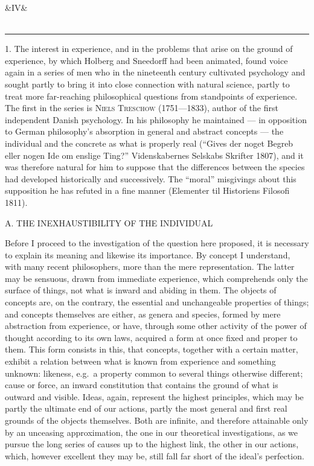 \documentclass[12pt,a4paper,openany]{book}
\newcommand{\opage}[1]{\marginnote{\footnotesize\textit{[#1]}}}
\newcommand{\anthsection}[2]{\clearpage\begin{center}\ifx&#1&\else{\large #1}\\[0.6em]\fi{\Large #2}\\[0.5em]\rule{3em}{0.4pt}\end{center}\medskip}
\newcommand{\excerpthead}[1]{\par\bigskip\begin{center}#1\end{center}\nopagebreak\smallskip}
\newenvironment{intro}{\par}{\par}
\begin{document}
\setcounter{footnote}{0}%
\anthsection{IV} {THE PSYCHOLOGICAL SCHOOL (TRESCHOW, SIBBERN, HOWITZ).}\opage{99}

\begin{intro}

1. The interest in experience, and in the problems that arise on the ground
of experience, by which Holberg and Sneedorff had been animated, found voice
again in a series of men who in the nineteenth century cultivated psychology
and sought partly to bring it into close connection with natural science,
partly to treat more far-reaching philosophical questions from standpoints of
experience. The first in the series is \textsc{Niels Treschow} (1751---1833),
author of the first independent Danish psychology. In his philosophy he
maintained --- in opposition to German philosophy's absorption in general
and abstract concepts --- the individual and the concrete as what is properly
real (``Gives der noget Begreb eller nogen Ide om enslige Ting?'' Videnskabernes
Selskabs Skrifter 1807), and it was therefore natural for him to suppose that the
differences between the species had developed historically and successively. The
``moral'' misgivings about this supposition he has refuted in a fine manner
(Elementer til Historiens Filosofi 1811).
\end{intro}

\excerpthead{A. THE INEXHAUSTIBILITY OF THE INDIVIDUAL}


Before I proceed to the investigation of the question here proposed, it is
necessary to explain its meaning and likewise its importance. By concept
I understand, with many recent philosophers, more than the mere representation.
The latter may be sensuous, drawn from immediate experience,
which comprehends only the surface of things, not what is inward and abiding
in them. The objects of concepts are, on the contrary, the essential and
unchangeable properties of things; and concepts themselves are either,
\setcounter{footnote}{0}%
\opage{100}as genera and species, formed by mere abstraction from experience, or have,
through some other activity of the power of thought according to its own laws,
acquired a form at once fixed and proper to them. This form consists in this,
that concepts, together with a certain matter, exhibit a relation between what is
known from experience and something unknown: likeness, e.g.\ a property
common to several things otherwise different; cause or force, an inward
constitution that contains the ground of what is outward and visible. Ideas,
again, represent the highest principles, which may be partly the ultimate end of
our actions, partly the most general and first real grounds of the objects
themselves. Both are infinite, and therefore attainable only by an unceasing
approximation, the one in our theoretical investigations, as we pursue the long
series of causes up to the highest link, the other in our actions, which, however
excellent they may be, still fall far short of the ideal's perfection.
\end{document}
